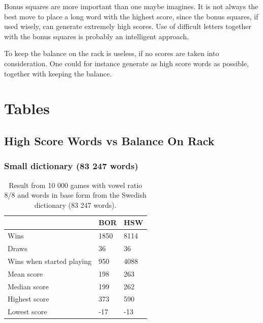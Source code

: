 \documentclass[a4paper, 12pt]{report}
\begin{document}
Bonus squares are more important than one maybe imagines. It is not always the best move to place a long word with the highest score, since the bonus squares, if used wisely, can generate extremely high scores. Use of difficult letters together with the bonus squares is probably an intelligent approach.

To keep the balance on the rack is useless, if no scores are taken into consideration. One could for instance generate as high score words as possible, together with keeping the balance.


\appendix
\chapter{Tables}

\section{High Score Words vs Balance On Rack}
\subsection{Small dictionary (83 247 words)}
\begin{table}[h]
\centering
    \begin{tabular}{ l | l | l }
   	& BOR & HSW \\
   	\hline
   	Wins & 1850 & 8114 \\
	Draws & 36 & 36 \\
	Wins when started playing & 950 & 4088 \\   	
	Mean score & 198 & 263 \\
	Median score & 199 & 262\\	 	 
	Highest score & 373 & 590 \\
	Lowest score & -17 & -13 \\		
    \end{tabular}
\caption{Result from 10 000 games with vowel ratio 8/8 and words in base form from the Swedish dictionary (83 247 words).}
\label{tab:borhswstats8smallDict}
\end{table}
\end{document}
